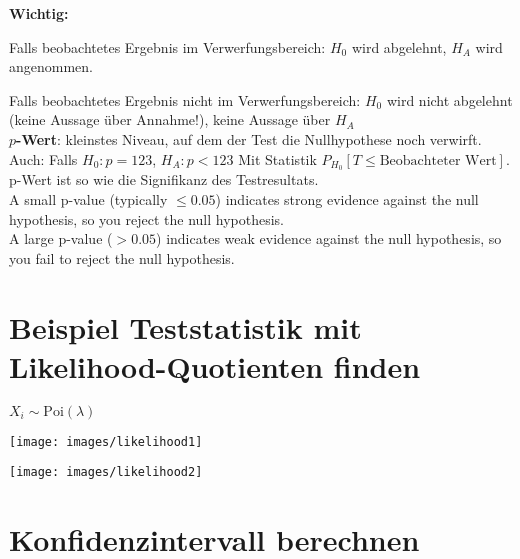 \textbf{Wichtig:}

Falls beobachtetes Ergebnis im Verwerfungsbereich: $H_0$ wird abgelehnt, $H_A$ wird angenommen.

Falls beobachtetes Ergebnis nicht im Verwerfungsbereich: $H_0$ wird nicht abgelehnt (keine Aussage über Annahme!), keine Aussage über $H_A$\\

\textbf{$p$-Wert}: kleinstes Niveau, auf dem der Test die Nullhypothese noch verwirft.\\

Auch: Falls $H_0: p = 123$, $H_A: p < 123$ Mit Statistik $P_{H_0}[T\leq \text{Beobachteter Wert}]$. p-Wert ist so wie die Signifikanz des Testresultats.\\

A small p-value (typically $\leq 0.05$) indicates strong evidence against the null hypothesis, so you reject the null hypothesis.\\

A large p-value ($> 0.05$) indicates weak evidence against the null hypothesis, so you fail to reject the null hypothesis.

\section{Beispiel Teststatistik mit Likelihood-Quotienten finden}

$X_i \sim \text{Poi}(\lambda)$ 

\texttt{[image: images/likelihood1]}

\texttt{[image: images/likelihood2]}

\section{Konfidenzintervall berechnen}

